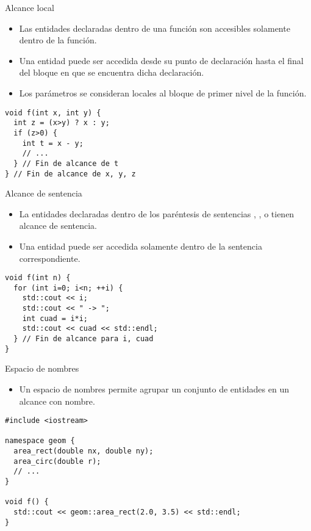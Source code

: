 \begin{frame}[fragile]{Alcance local}
\begin{itemize}
  \item Las entidades declaradas dentro de una función son accesibles solamente dentro de la función.
  \item Una entidad puede ser accedida desde su punto de declaración hasta el final del bloque en que se encuentra
        dicha declaración.
  \item Los parámetros se consideran locales al bloque de primer nivel de la función.
\end{itemize}
\begin{lstlisting}
void f(int x, int y) {
  int z = (x>y) ? x : y;
  if (z>0) {
    int t = x - y;
    // ...
  } // Fin de alcance de t
} // Fin de alcance de x, y, z
\end{lstlisting}
\end{frame}

\begin{frame}[fragile]{Alcance de sentencia}
\begin{itemize}
  \item La entidades declaradas dentro de los paréntesis de sentencias , ,  o 
        tienen alcance de sentencia.
  \item Una entidad puede ser accedida solamente dentro de la sentencia correspondiente.
\end{itemize}
\begin{lstlisting}
void f(int n) {
  for (int i=0; i<n; ++i) {
    std::cout << i;
    std::cout << " -> ";
    int cuad = i*i;
    std::cout << cuad << std::endl;
  } // Fin de alcance para i, cuad
}
\end{lstlisting}
\end{frame}


\begin{frame}[fragile]{Espacio de nombres}
\begin{itemize}
  \item Un \alert{espacio de nombres} permite agrupar un conjunto de entidades en un alcance con nombre.
\end{itemize}
\begin{lstlisting}
#include <iostream>

namespace geom {
  area_rect(double nx, double ny);
  area_circ(double r);
  // ...
}

void f() {
  std::cout << geom::area_rect(2.0, 3.5) << std::endl;
}
\end{lstlisting}
\end{frame}

